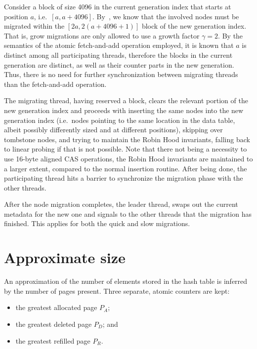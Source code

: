 Consider a block of size 4096 in the current generation index that starts at position $a$, i.e.\ $[a, a + 4096]$.
By~\cite[Lemma~5.1]{maier}, we know that the involved nodes must be migrated within the $[2a, 2(a + 4096 + 1)]$ block of the new generation index.
That is, grow migrations are only allowed to use a growth factor $\gamma = 2$.
By the semantics of the atomic fetch-and-add operation employed, it is known that $a$ is distinct among all participating threads, therefore the blocks in the current generation are distinct, as well as their counter parts in the new generation.
Thus, there is no need for further synchronization between migrating threads than the fetch-and-add operation.

The migrating thread, having reserved a block, clears the relevant portion of the new generation index and proceeds with inserting the same nodes into the new generation index (i.e.\ nodes pointing to the same location in the data table, albeit possibly differently sized and at different positions), skipping over tombstone nodes, and trying to maintain the Robin Hood invariants, falling back to linear probing if that is not possible.
Note that there not being a necessity to use 16-byte aligned CAS operations, the Robin Hood invariants are maintained to a larger extent, compared to the normal insertion routine.
After being done, the participating thread hits a barrier to synchronize the migration phase with the other threads.

After the node migration completes, the leader thread, swaps out the current metadata for the new one and signals to the other threads that the migration has finished.
This applies for both the quick and slow migrations.


\section{Approximate size}\label{sec:approximate-size}

An approximation of the number of elements stored in the hash table is inferred by the number of pages present.
Three separate, atomic counters are kept:

\begin{itemize}
	\item the greatest allocated page $P_A$;
	\item the greatest deleted page $P_D$; and
	\item the greatest refilled page $P_R$.
\end{itemize}

